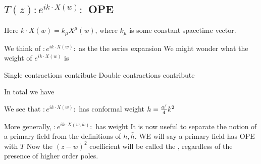 \documentclass{article}
\begin{document}
\subsection{\texorpdfstring{$T(z) : e^{ik \cdot X(w)} :$}{T} OPE }
Here $k \cdot X(w) = k_\mu X^\mu (w)$, where $k_\mu$ is some constant spacetime vector. 

We think of $:e^{ik \cdot X(w)}:$ as the the series expansion
We might wonder what the weight of $e^{ik \cdot X(w)}$ is 

Single contractions contribute 
Double contractions contribute 

In total we have 

We see that $: e^{i k \cdot X(w) }:$ has conformal weight $h = \frac{\alpha^\prime}{4} k^2$

More generally, $: e^{i k \cdot X(w,\bar{w}) }:$ has weight 
It is now useful to separate the notion of a primary field from the definitions of $h,\bar{h}$. WE will say a primary field has OPE with $T$ 
Now the $(z-w)^2$ coefficient will be called the , regardless of the presence of higher order poles. 
\end{document}
